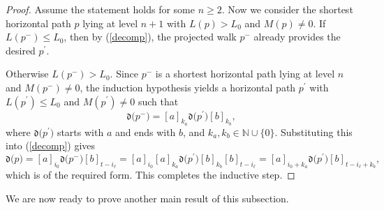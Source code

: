 \documentclass[reqno]{amsart}
\theoremstyle{plain}
\numberwithin{equation}{section}
\begin{document}
\begin{proof}
Assume the statement holds for some $n\geq 2$. Now we consider the shortest
horizontal path $p$ lying at level $n+1$ with $L(p)>L_{0}$ and $M(p)\neq 0$.
If $L(p^{-})\leq L_{0}$, then by (\ref{decomp}), the projected walk $p^{-}$
already provides the desired $p^{\prime }$.

Otherwise $L(p^{-})>L_{0}$. Since $p^{-}$ is a shortest horizontal path
lying at level $n$ and $M(p^{-})\neq 0$, the induction hypothesis yields a
horizontal path $p^{\prime }$ with $L(p^{\prime })\leq L_{0}$ and $%
M(p^{\prime })\neq 0$ such that 
\begin{equation*}
\mathfrak{d(}p^{-})=[a]_{k_{a}}\mathfrak{d(}p^{\prime })[b]_{k_{b}},
\end{equation*}%
where $\mathfrak{d(}p^{\prime })$ starts with $a$ and ends with $b$, and $%
k_{a},k_{b}\in \mathbb{N}\cup \{0\}$. Substituting this into (\ref{decomp})
gives 
\begin{equation*}
\mathfrak{d(}p)=[a]_{i_{0}}\mathfrak{d(}p^{-})[b]_{t-i_{\ell
}}=[a]_{i_{0}}[a]_{k_{a}}\mathfrak{d(}p^{\prime })[b]_{k_{b}}[b]_{t-i_{\ell
}}=[a]_{i_{0}+k_{a}}\mathfrak{d(}p^{\prime })[b]_{t-i_{\ell }+k_{b}},
\end{equation*}%
which is of the required form. This completes the inductive step.
\end{proof}

We are now ready to prove another main result of this subsection.
\end{document}

